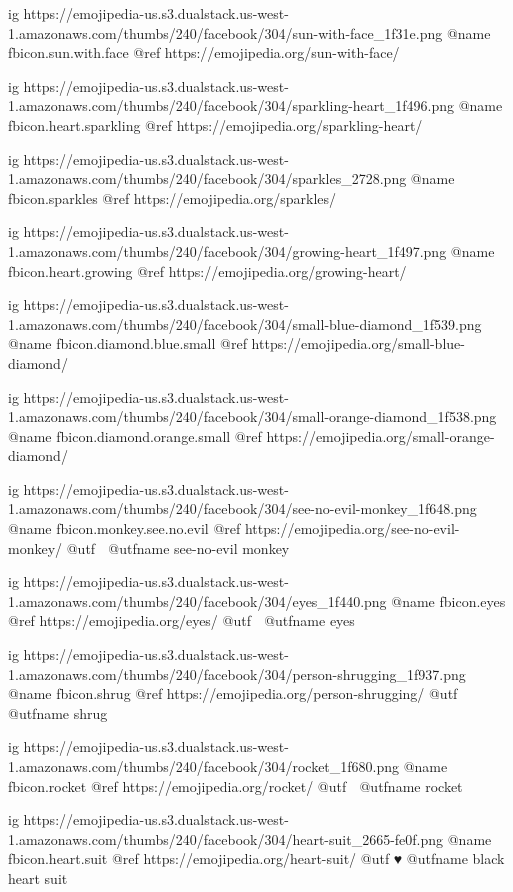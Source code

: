   ig https://emojipedia-us.s3.dualstack.us-west-1.amazonaws.com/thumbs/240/facebook/304/sun-with-face_1f31e.png
  @name fbicon.sun.with.face
  @ref https://emojipedia.org/sun-with-face/

  ig https://emojipedia-us.s3.dualstack.us-west-1.amazonaws.com/thumbs/240/facebook/304/sparkling-heart_1f496.png
  @name fbicon.heart.sparkling
  @ref https://emojipedia.org/sparkling-heart/

  ig https://emojipedia-us.s3.dualstack.us-west-1.amazonaws.com/thumbs/240/facebook/304/sparkles_2728.png
  @name fbicon.sparkles
  @ref https://emojipedia.org/sparkles/

  ig https://emojipedia-us.s3.dualstack.us-west-1.amazonaws.com/thumbs/240/facebook/304/growing-heart_1f497.png
  @name fbicon.heart.growing
  @ref https://emojipedia.org/growing-heart/

	ig https://emojipedia-us.s3.dualstack.us-west-1.amazonaws.com/thumbs/240/facebook/304/small-blue-diamond_1f539.png
	@name fbicon.diamond.blue.small
	@ref https://emojipedia.org/small-blue-diamond/

	ig https://emojipedia-us.s3.dualstack.us-west-1.amazonaws.com/thumbs/240/facebook/304/small-orange-diamond_1f538.png
	@name fbicon.diamond.orange.small
	@ref https://emojipedia.org/small-orange-diamond/

	ig https://emojipedia-us.s3.dualstack.us-west-1.amazonaws.com/thumbs/240/facebook/304/see-no-evil-monkey_1f648.png
	@name fbicon.monkey.see.no.evil
	@ref https://emojipedia.org/see-no-evil-monkey/
  @utf 🙈
  @utfname see-no-evil monkey

	ig https://emojipedia-us.s3.dualstack.us-west-1.amazonaws.com/thumbs/240/facebook/304/eyes_1f440.png
	@name fbicon.eyes
	@ref https://emojipedia.org/eyes/
	@utf 👀
	@utfname eyes

	ig https://emojipedia-us.s3.dualstack.us-west-1.amazonaws.com/thumbs/240/facebook/304/person-shrugging_1f937.png
	@name fbicon.shrug
	@ref https://emojipedia.org/person-shrugging/
	@utf 🤷
	@utfname shrug

	ig https://emojipedia-us.s3.dualstack.us-west-1.amazonaws.com/thumbs/240/facebook/304/rocket_1f680.png
	@name fbicon.rocket
	@ref https://emojipedia.org/rocket/
	@utf 🚀
	@utfname rocket

	ig https://emojipedia-us.s3.dualstack.us-west-1.amazonaws.com/thumbs/240/facebook/304/heart-suit_2665-fe0f.png
	@name fbicon.heart.suit
	@ref https://emojipedia.org/heart-suit/
	@utf ♥️
	@utfname black heart suit


